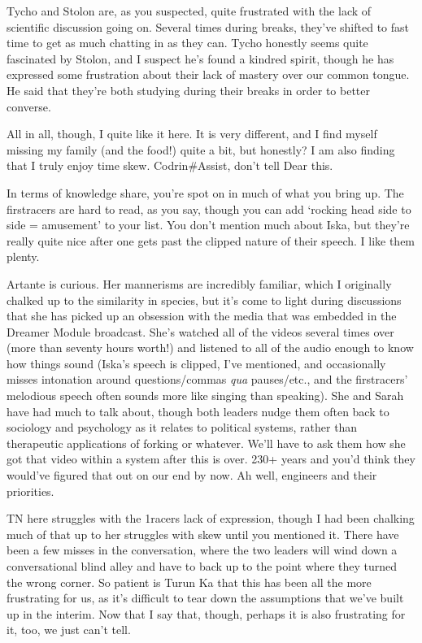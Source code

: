 Tycho and Stolon are, as you suspected, quite frustrated with the lack of scientific discussion going on. Several times during breaks, they've shifted to fast time to get as much chatting in as they can. Tycho honestly seems quite fascinated by Stolon, and I suspect he's found a kindred spirit, though he has expressed some frustration about their lack of mastery over our common tongue. He said that they're both studying during their breaks in order to better converse.

All in all, though, I quite like it here. It is very different, and I find myself missing my family (and the food!) quite a bit, but honestly? I am also finding that I truly enjoy time skew. Codrin\#Assist, don't tell Dear this.

In terms of knowledge share, you're spot on in much of what you bring up. The firstracers are hard to read, as you say, though you can add `rocking head side to side = amusement' to your list. You don't mention much about Iska, but they're really quite nice after one gets past the clipped nature of their speech. I like them plenty.

Artante is curious. Her mannerisms are incredibly familiar, which I originally chalked up to the similarity in species, but it's come to light during discussions that she has picked up an obsession with the media that was embedded in the Dreamer Module broadcast. She's watched all of the videos several times over (more than seventy hours worth!) and listened to all of the audio enough to know how things sound (Iska's speech is clipped, I've mentioned, and occasionally misses intonation around questions/commas \emph{qua} pauses/etc., and the firstracers' melodious speech often sounds more like singing than speaking). She and Sarah have had much to talk about, though both leaders nudge them often back to sociology and psychology as it relates to political systems, rather than therapeutic applications of forking or whatever. We'll have to ask them how she got that video within a system after this is over. 230+ years and you'd think they would've figured that out on our end by now. Ah well, engineers and their priorities.

TN here struggles with the 1racers lack of expression, though I had been chalking much of that up to her struggles with skew until you mentioned it. There have been a few misses in the conversation, where the two leaders will wind down a conversational blind alley and have to back up to the point where they turned the wrong corner. So patient is Turun Ka that this has been all the more frustrating for us, as it's difficult to tear down the assumptions that we've built up in the interim. Now that I say that, though, perhaps it is also frustrating for it, too, we just can't tell.

